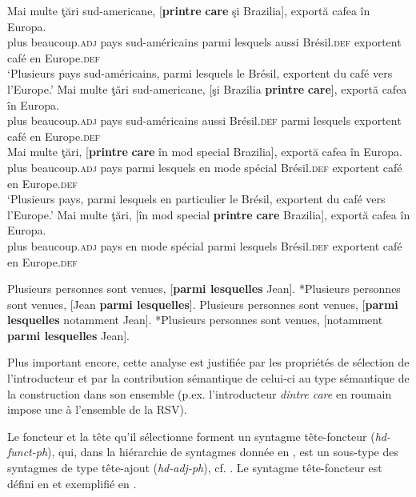\ea \label{ch3:ex130}
\ea
\gll Mai  multe  ţări  sud-americane,  [\textbf{printre} \textbf{care} şi  Brazilia], exportă  cafea  în  Europa. \\
plus  beaucoup.\textsc{adj}  pays  sud-américains  parmi  lesquels  aussi  Brésil.\textsc{def} 
exportent  café  en  Europe.\textsc{def} \\
\glt ‘Plusieurs pays sud-américains, parmi lesquels le Brésil, exportent du café vers l'Europe.’
\ex 
\gll *Mai  multe  ţări  sud-americane,  [şi  Brazilia  \textbf{printre} \textbf{care}], exportă  cafea  în  Europa.\\
plus  beaucoup.\textsc{adj}  pays  sud-américains  aussi  Brésil.\textsc{def}  parmi  lesquels exportent  café  en  Europe.\textsc{def} \\
\ex 
\gll Mai  multe  ţări,  [\textbf{printre} \textbf{care} în  mod  special Brazilia], exportă  cafea  în  Europa. \\
plus  beaucoup.\textsc{adj} pays  parmi  lesquels  en  mode spécial  Brésil.\textsc{def} 
exportent  café  en  Europe.\textsc{def} \\
\glt ‘Plusieurs pays, parmi lesquels en particulier le Brésil, exportent du café vers l'Europe.’
\ex 
\gll *Mai  multe  ţări,  [în  mod  special  \textbf{printre} \textbf{care}  Brazilia], exportă  cafea  în  Europa.\\
plus  beaucoup.\textsc{adj}  pays  en  mode  spécial  parmi lesquels  Brésil.\textsc{def} exportent  café  en  Europe\textsc{.def} \\
\z 
\z

\ea \label{ch3:ex131}
\ea 
Plusieurs personnes sont venues, [\textbf{parmi lesquelles} Jean].
\ex
*Plusieurs personnes sont venues, [Jean \textbf{parmi lesquelles}].
\ex
Plusieurs personnes sont venues, [\textbf{parmi lesquelles} notamment Jean].
\ex 
*Plusieurs personnes sont venues, [notamment \textbf{parmi lesquelles} Jean].
\z 
\z

Plus important encore, cette analyse est justifiée par les propriétés de sélection de l’introducteur et par la contribution sémantique de celui-ci au type sémantique de la construction dans son ensemble (p.ex. l’introducteur \textit{dintre care} en roumain impose une  à l’ensemble de la RSV).

Le foncteur et la tête qu’il sélectionne forment un syntagme tête-foncteur (\textit{hd-funct-ph}), qui, dans la hiérarchie de syntagmes donnée en , est un sous-type des syntagmes de type tête-ajout (\textit{hd-adj-ph}), cf. \citet{VanEynde2007}. Le syntagme tête-foncteur est défini en  et exemplifié en .

